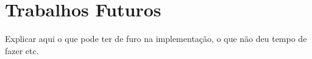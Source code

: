 \documentclass[twoside,english,brazilian]{UNISINOSartigo}
\begin{document}
\section{Trabalhos Futuros}
\label{futuros}

Explicar aqui o que pode ter de furo na implementação, o que não deu tempo de fazer etc.




\end{document}
